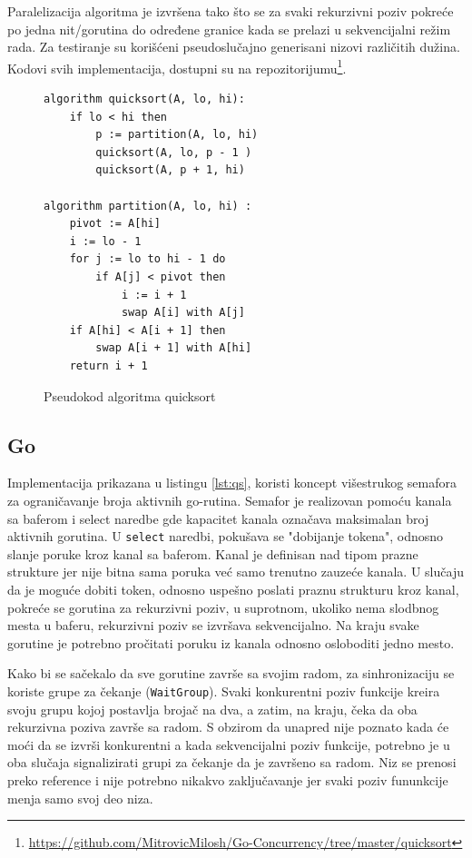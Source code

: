 \documentclass[12pt,oneside]{memoir}
\begin{document}
Paralelizacija algoritma je izvršena tako što se za svaki rekurzivni poziv pokreće po jedna nit/gorutina do određene granice kada se prelazi u sekvencijalni režim rada. Za testiranje su korišćeni pseudoslučajno generisani nizovi različitih dužina. Kodovi svih implementacija, dostupni su na repozitorijumu\footnote{\url{https://github.com/MitrovicMilosh/Go-Concurrency/tree/master/quicksort}}.

\begin{figure}
\begin{center}

\begin{Verbatim}[fontsize=\small]
algorithm quicksort(A, lo, hi):
    if lo < hi then
        p := partition(A, lo, hi)
        quicksort(A, lo, p - 1 )
        quicksort(A, p + 1, hi)

algorithm partition(A, lo, hi) :
    pivot := A[hi]
    i := lo - 1    
    for j := lo to hi - 1 do
        if A[j] < pivot then
            i := i + 1
            swap A[i] with A[j]
    if A[hi] < A[i + 1] then
        swap A[i + 1] with A[hi]
    return i + 1
\end{Verbatim}

\caption{Pseudokod algoritma quicksort}
\label{fig:qs_pseudo}
\end{center}
\end{figure}


\subsection{Go}
\label{qs:go}
Implementacija prikazana u listingu \ref{lst:qs}, koristi koncept višestrukog semafora za ograničavanje broja aktivnih go-rutina. Semafor je realizovan pomoću kanala sa baferom i select naredbe gde kapacitet kanala označava maksimalan broj aktivnih gorutina. U \texttt{select} naredbi, pokušava se "dobijanje tokena", odnosno slanje poruke kroz kanal sa baferom. Kanal je definisan nad tipom prazne strukture jer nije bitna sama poruka već samo trenutno zauzeće kanala. U slučaju da je moguće dobiti token, odnosno uspešno poslati praznu strukturu kroz kanal, pokreće se gorutina za rekurzivni poziv, u suprotnom, ukoliko nema slodbnog mesta u baferu, rekurzivni poziv se izvršava sekvencijalno. Na kraju svake gorutine je potrebno pročitati poruku iz kanala odnosno osloboditi jedno mesto.

 Kako bi se sačekalo da sve gorutine završe sa svojim radom, za sinhronizaciju se koriste grupe za čekanje (\texttt{WaitGroup}). Svaki konkurentni poziv funkcije kreira svoju grupu kojoj postavlja brojač na dva, a zatim, na kraju, čeka da oba rekurzivna poziva završe sa radom. S obzirom da unapred nije poznato kada će moći da se izvrši konkurentni a kada sekvencijalni poziv funkcije, potrebno je u oba slučaja signalizirati grupi za čekanje da je završeno sa radom. Niz se prenosi preko reference i nije potrebno nikakvo zaključavanje jer svaki poziv fununkcije menja samo svoj deo niza.
\end{document}

